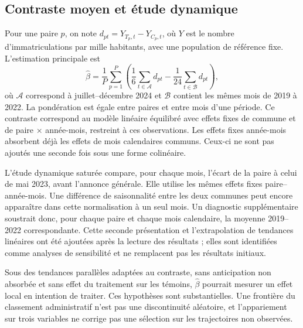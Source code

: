 \begin{table}[htbp]\centering\small\caption{Caractéristiques préalables et équilibre des comparaisons}\label{tab:balance}\end{table}

\subsection{Contraste moyen et étude dynamique}
Pour une paire $p$, on note $d_{pt}=Y_{T_p,t}-Y_{C_p,t}$, où $Y$ est le nombre d’immatriculations par mille habitants, avec une population de référence fixe. L’estimation principale est
\begin{equation}\widehat\beta=\frac1P\sum_{p=1}^{P}\left(\frac16\sum_{t\in\mathcal{A}}d_{pt}-\frac1{24}\sum_{t\in\mathcal{B}}d_{pt}\right),\end{equation}
où $\mathcal{A}$ correspond à juillet–décembre 2024 et $\mathcal{B}$ contient les mêmes mois de 2019 à 2022. La pondération est égale entre paires et entre mois d’une période. Ce contraste correspond au modèle linéaire équilibré avec effets fixes de commune et de paire × année-mois, restreint à ces observations. Les effets fixes année-mois absorbent déjà les effets de mois calendaires communs. Ceux-ci ne sont pas ajoutés une seconde fois sous une forme colinéaire.

L’étude dynamique saturée compare, pour chaque mois, l’écart de la paire à celui de mai 2023, avant l’annonce générale. Elle utilise les mêmes effets fixes paire–année-mois. Une différence de saisonnalité entre les deux communes peut encore apparaître dans cette normalisation à un seul mois. Un diagnostic supplémentaire soustrait donc, pour chaque paire et chaque mois calendaire, la moyenne 2019–2022 correspondante. Cette seconde présentation et l’extrapolation de tendances linéaires ont été ajoutées après la lecture des résultats ; elles sont identifiées comme analyses de sensibilité et ne remplacent pas les résultats initiaux.

Sous des tendances parallèles adaptées au contraste, sans anticipation non absorbée et sans effet du traitement sur les témoins, $\widehat\beta$ pourrait mesurer un effet local en intention de traiter. Ces hypothèses sont substantielles. Une frontière du classement administratif n’est pas une discontinuité aléatoire, et l’appariement sur trois variables ne corrige pas une sélection sur les trajectoires non observées.

